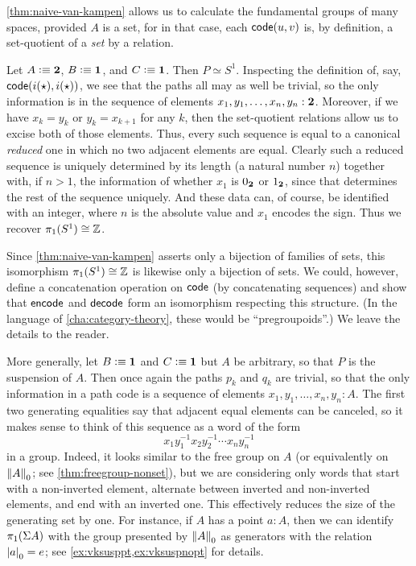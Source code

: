 \autoref{thm:naive-van-kampen} allows us to calculate the fundamental groups of many spaces, provided $A$ is a set,
for in that case, each $\code(u,v)$ is, by definition, a set-quotient of a {\em set} by a relation.

\begin{eg}\label{eg:circle}
  Let $A\defeq \bool$, $B\defeq\unit$, and $C\defeq \unit$.
  Then $P \simeq S^1$.
  Inspecting the definition of, say, $\code(i(\ttt),i(\ttt))$, we see that the paths all may as well be trivial, so the only information is in the sequence of elements $x_1,y_1,\dots,x_n,y_n: \bool$.
  Moreover, if we have $x_k=y_k$ or $y_k=x_{k+1}$ for any $k$, then the set-quotient relations allow us to excise both of those elements.
  Thus, every such sequence is equal to a canonical \emph{reduced} one in which no two adjacent elements are equal.
  Clearly such a reduced sequence is uniquely determined by its length (a natural number $n$) together with, if $n>1$, the information of whether $x_1$ is $\bfalse$ or $\btrue$, since that determines the rest of the sequence uniquely.
  And these data can, of course, be identified with an integer, where $n$ is the absolute value and $x_1$ encodes the sign.
  Thus we recover $\pi_1(S^1)\cong \Z$.
\end{eg}

Since \autoref{thm:naive-van-kampen} asserts only a bijection of families of sets, this isomorphism $\pi_1(S^1)\cong \Z$ is likewise only a bijection of sets.
We could, however, define a concatenation operation on $\code$ (by concatenating sequences) and show that $\encode$ and $\decode$ form an isomorphism respecting this structure.
(In the language of \autoref{cha:category-theory}, these would be ``pregroupoids''.)
We leave the details to the reader.

\begin{eg}\label{eg:suspension}
  More generally, let $B\defeq\unit$ and $C\defeq \unit$ but $A$ be arbitrary, so that $P$ is the suspension of $A$.
  Then once again the paths $p_k$ and $q_k$ are trivial, so that the only information in a path code is a sequence of elements $x_1,y_1,\dots,x_n,y_n: A$.
  The first two generating equalities say that adjacent equal elements can be canceled, so it makes sense to think of this sequence as a word of the form
  \[ x_1 y_1^{-1} x_2 y_2^{-1} \cdots x_n y_n^{-1} \]
  in a group.
  Indeed, it looks similar to the free group on $A$ (or equivalently on $\trunc0A$; see \autoref{thm:freegroup-nonset}), but we are considering only words that start with a non-inverted element, alternate between inverted and non-inverted elements, and end with an inverted one.
  This effectively reduces the size of the generating set by one.
  For instance, if $A$ has a point $a:A$, then we can identify $\pi_1(\susp A)$ with the group presented by $\trunc0A$ as generators with the relation $\tproj0a = e$; see \autoref{ex:vksusppt,ex:vksuspnopt} for details.
\end{eg}

